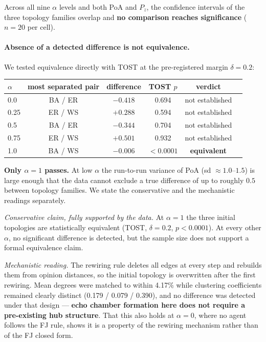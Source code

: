 Across all nine $\alpha$ levels and both PoA and $P_z$, the confidence intervals of the
three topology families overlap and \textbf{no comparison reaches significance}
($n = 20$ per cell).

\paragraph{Absence of a detected difference is not equivalence.}
We tested equivalence directly with TOST at the pre-registered margin $\delta = 0.2$:

\begin{center}
\begin{tabular}{lccccc}
\toprule
$\alpha$ & most separated pair & difference & TOST $p$ & verdict \\
\midrule
0.0  & BA / ER & $-0.418$ & 0.694 & not established \\
0.25 & ER / WS & $+0.288$ & 0.594 & not established \\
0.5  & BA / ER & $-0.344$ & 0.704 & not established \\
0.75 & ER / WS & $+0.501$ & 0.932 & not established \\
1.0  & BA / WS & $\mathbf{-0.006}$ & $\mathbf{<0.0001}$ & \textbf{equivalent} \\
\bottomrule
\end{tabular}
\end{center}

\textbf{Only $\alpha = 1$ passes.} At low $\alpha$ the run-to-run variance of PoA
(sd $\approx 1.0$--$1.5$) is large enough that the data cannot exclude a true difference
of up to roughly $0.5$ between topology families. We state the conservative and the
mechanistic readings separately.

\emph{Conservative claim, fully supported by the data.} At $\alpha = 1$ the three initial
topologies are statistically equivalent (TOST, $\delta = 0.2$, $p < 0.0001$). At every
other $\alpha$, no significant difference is detected, but the sample size does not
support a formal equivalence claim.

\emph{Mechanistic reading.} The rewiring rule deletes all edges at every step and rebuilds
them from opinion distances, so the initial topology is overwritten after the first
rewiring. Mean degrees were matched to within 4.17\% while clustering coefficients
remained clearly distinct (0.179 / 0.079 / 0.390), and no difference was detected under
that design --- \textbf{echo chamber formation here does not require a pre-existing hub
structure}. That this also holds at $\alpha = 0$, where no agent follows the FJ rule,
shows it is a property of the rewiring mechanism rather than of the FJ closed form.

